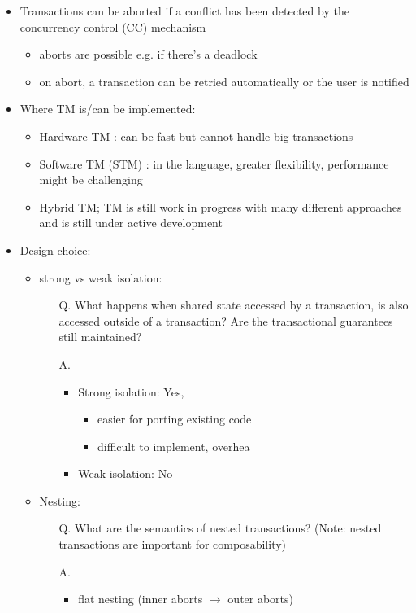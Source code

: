 \documentclass[a4paper]{article}
\begin{document}
\begin{itemize}
\begin{itemize}
\end{itemize}
\item Transactions can be aborted if a conflict has been detected by the concurrency control (CC) mechanism 
\begin{itemize}
\item aborts are possible e.g. if there’s a deadlock
\item on abort, a transaction can be retried automatically or the user is notified
\end{itemize}
\item Where TM is/can be implemented: 
\begin{itemize}
\item Hardware TM : can be fast but cannot handle big transactions
\item Software TM (STM) : in the language, greater flexibility, performance might be challenging
\item Hybrid TM; TM is still work in progress with many different approaches and is still under active development
\end{itemize}
\item Design choice: 
\begin{itemize}
\item strong vs weak isolation:
\begin{enumerate}
\item[Q.] What happens when shared state accessed by a transaction, is also accessed outside of a transaction? Are the transactional guarantees still maintained? 
\item[A.]
\begin{itemize}
\item Strong isolation: Yes, 
\begin{itemize}
\item easier for porting existing code
\item difficult to implement, overhea
\end{itemize}
\item Weak isolation: No
\end{itemize}
\end{enumerate}
\item Nesting:
\begin{enumerate}
\item[Q.] What are the semantics of nested transactions? (Note: nested transactions are important for composability)
\item[A.]
\begin{itemize}
\item flat nesting (inner aborts $\rightarrow$ outer aborts)

\end{itemize}
\end{enumerate}
\end{itemize}
\end{itemize}
\end{document}
